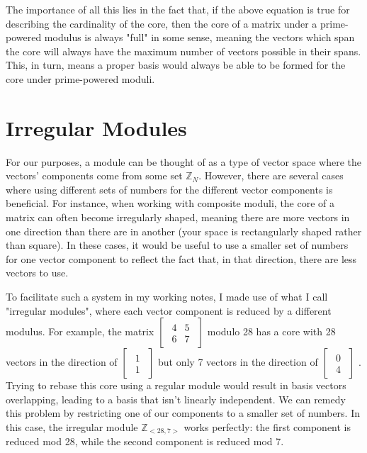 \documentclass[a4paper, 12pt, reqno]{amsart}
\newcommand{\ssection}[1]{\vspace{1cm}\section{#1}}
\begin{document}
		The importance of all this lies in the fact that, if the above equation is true for describing
		the cardinality of the core, then the core of a matrix under a prime-powered modulus is always
		"full" in some sense, meaning the vectors which span the core will always have the maximum number
		of vectors possible in their spans. This, in turn, means a proper basis would always be able to be 
		formed for the core under prime-powered moduli.
		
	\ssection{Irregular Modules}
		For our purposes, a module can be thought of as a type of vector space where the vectors' components
		come from some set $\mathds{Z}_{N}$. However, there are several cases where using different sets
		of numbers for the different vector components is beneficial. For instance, when working with
		composite moduli, the core of a matrix can often become irregularly shaped, meaning there are
		more vectors in one direction than there are in another (your space is rectangularly shaped
		rather than square). In these cases, it would be useful to use a smaller set of numbers for one
		vector component to reflect the fact that, in that direction, there are less vectors to use.
		
		To facilitate such a system in my working notes, I made use of what I call "irregular modules",
		where each vector component is reduced by a different modulus. For example, the matrix
		$
			\begin{bmatrix}
				\begin{smallmatrix}
					4 & 5 \\
					6 & 7
				\end{smallmatrix}
			\end{bmatrix}
		$
		modulo 28 has a core with 28 vectors in the direction of 
		$
			\begin{bmatrix}
				\begin{smallmatrix}
					1 \\
					1
				\end{smallmatrix}
			\end{bmatrix}
		$
		but only 7 vectors in the direction of
		$
			\begin{bmatrix}
				\begin{smallmatrix}
					0 \\
					4
				\end{smallmatrix}
			\end{bmatrix}
		$
		. Trying to rebase this core using a regular module would result in basis vectors overlapping, leading 
		to a basis that isn't linearly independent. We can remedy this problem by restricting one of our
		components to a smaller set of numbers. In this case, the irregular module $\mathds{Z}_{<28, 7>}$ works
		perfectly: the first component is reduced mod 28, while the second component is reduced mod 7.
		
\end{document}
